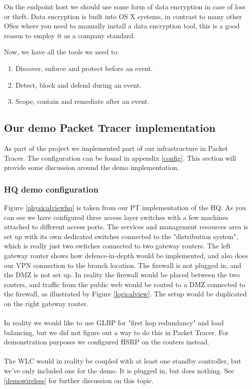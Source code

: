 On the endpoint host we should use some form of data encryption in case of loss or theft. Data encryption is built into OS X systems, in contrast to many other OSes where you need to manually install a data encryption tool, this is a good reason to employ it as a company standard.

Now, we have all the tools we need to:
\begin{enumerate}
    \item Discover, enforce and protect before an event.
    \item Detect, block and defend during an event.
    \item Scope, contain and remediate after an event.
\end{enumerate}



\subsection{Our demo Packet Tracer implementation}


As part of the project we implemented part of our infrastructure in Packet Tracer. The configuration can be found in appendix \ref{config}. This section will provide some discussion around the demo implementation.

\subsubsection{HQ demo configuration}

Figure \ref{physicalviewhq} is taken from our PT implementation of the HQ. As you can see we have configured three access layer switches with a few machines attached to different access ports. The services and management resources area is set up with its own dedicated switches connected to the "distribution system", which is really just two switches connected to two gateway routers. The left gateway router shows how defence-in-depth would be implemented, and also does our VPN connection to the branch location. The firewall is not plugged in, and the DMZ is not set up. In reality the firewall would be placed between the two routers, and traffic from the public web would be routed to a DMZ connected to the firewall, as illustrated by Figure \ref{logicalview}. The setup would be duplicated on the right gateway router.
\\
\\
In reality we would like to use GLBP for "first hop redundancy" and load balancing, but we did not figure out a way to do this in Packet Tracer. For demonstration purposes we configured HSRP on the routers instead.
\\
\\
The WLC would in reality be coupled with at least one standby controller, but we've only included one for the demo. It is plugged in, but does nothing. See \ref{demowireless} for further discussion on this topic.


